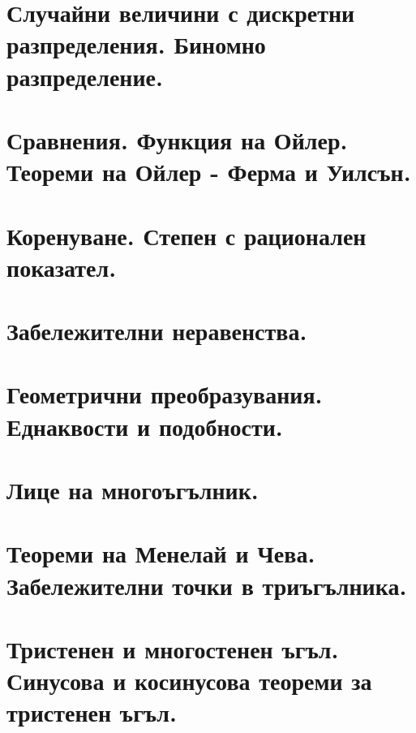 \chapter{Случайни величини с дискретни разпределения. Биномно разпределение.}

\chapter{Сравнения. Функция на Ойлер. Теореми на Ойлер - Ферма и Уилсън.}

\chapter{Коренуване. Степен с рационален показател.}

\chapter{Забележителни неравенства.}

\chapter{Геометрични преобразувания. Еднаквости и подобности.}

\chapter{Лице на многоъгълник.}

\chapter{Теореми на Менелай и Чева. Забележителни точки в триъгълника.}

\chapter{Тристенен и многостенен ъгъл. Синусова и косинусова теореми за тристенен ъгъл.}
